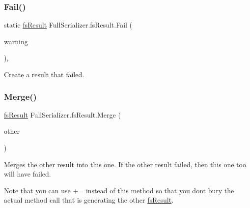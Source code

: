 \mbox{\label{struct_full_serializer_1_1fs_result_a668c1169410a20364aa7c53f98d00617}} 
\subsubsection{\texorpdfstring{Fail()}{Fail()}}
{\footnotesize\ttfamily static \hyperlink{struct_full_serializer_1_1fs_result}{fs\+Result} Full\+Serializer.\+fs\+Result.\+Fail (\begin{DoxyParamCaption}\item[{string}]{warning }\end{DoxyParamCaption})\hspace{0.3cm}{\ttfamily [inline]}, {\ttfamily [static]}}



Create a result that failed. 

\mbox{\label{struct_full_serializer_1_1fs_result_abb53580c70996e49251eb1fd4bc62f4b}} 
\subsubsection{\texorpdfstring{Merge()}{Merge()}}
{\footnotesize\ttfamily \hyperlink{struct_full_serializer_1_1fs_result}{fs\+Result} Full\+Serializer.\+fs\+Result.\+Merge (\begin{DoxyParamCaption}\item[{\hyperlink{struct_full_serializer_1_1fs_result}{fs\+Result}}]{other }\end{DoxyParamCaption})\hspace{0.3cm}{\ttfamily [inline]}}



Merges the other result into this one. If the other result failed, then this one too will have failed. 

Note that you can use += instead of this method so that you don\textquotesingle{}t bury the actual method call that is generating the other \hyperlink{struct_full_serializer_1_1fs_result}{fs\+Result}. \mbox{\label{struct_full_serializer_1_1fs_result_a6625430da8b5013745d6eb7c1512f1e6}} 

